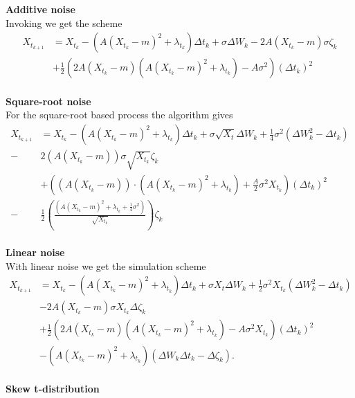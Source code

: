 \noindent \textbf{Additive noise}\\
Invoking \cite[algorithm 8.5]{Srkk2019} we get the scheme
\begin{align}
    X_{t_{k + 1}} &= X_{t_k} - \left(A(X_{t_k} - m)^2 + \lambda_{t_k}\right) \Delta t_k + \sigma \Delta W_{k} - 2 A \left(X_{t_k} - m\right)\sigma \zeta_{k} \nonumber \\
    & + \frac{1}{2}\left(2A\left(X_{t_k} - m\right)\left(A\left(X_{t_k} - m\right)^2 + \lambda_{t_k}\right) - A \sigma^2\right)\left(\Delta t_k\right)^2
\end{align}
\\
\textbf{Square-root noise}\\
For the square-root based process the algorithm gives 
\begin{align}
    X_{t_{k + 1}} &= X_{t_k} - \left(A(X_{t_k} - m)^2 + \lambda_{t_k}\right) \Delta t_k + \sigma \sqrt{X_t} \Delta W_{k} + \frac{1}{4}\sigma^2 \left(\Delta W_k^2 - \Delta t_k\right)\nonumber\\
    - & 2\left(A\left(X_{t_k} - m\right)\right)\sigma \sqrt{X_{t_k}} \zeta_k
    \nonumber\\ &+ \left(\left(A\left(X_{t_k} - m\right)\right)\cdot \left(A\left(X_{t_k} - m\right)^2 + \lambda_{t_k}\right) + \frac{A}{2}\sigma^2 X_{t_k}\right)(\Delta t_k)^2 \nonumber\\
    -&\frac{1}{2}\left(\frac{\left(A\left(X_{t_k} - m\right)^2 + \lambda_{t_k} + \frac{1}{4}\sigma^2\right)}{\sqrt{X_{t_k}}}\right) \zeta_k
\end{align}
\\
\textbf{Linear noise}\\
With linear noise we get the simulation scheme
\begin{align}
    X_{t_{k + 1}} &= X_{t_k} - \left(A(X_{t_k} - m)^2 + \lambda_{t_k}\right) \Delta t_k + \sigma X_t \Delta W_{k} + \frac{1}{2}\sigma^2 X_{t_k}\left(\Delta W_{k}^2 - \Delta t_k\right) \nonumber \\
    &-2A(X_{t_k} - m)\sigma X_{t_k} \Delta \zeta_k \nonumber\\
    & + \frac{1}{2}\left(2A\left(X_{t_k} - m\right)\left(A\left(X_{t_k} - m\right)^2 + \lambda_{t_k}\right) - A\sigma^2X_{t_k}\right)(\Delta t_k)^2 \nonumber \\
    &- \left(A\left(X_{t_k} - m\right)^2 + \lambda_{t_k}\right)\left(\Delta W_{k}\Delta t_k - \Delta \zeta_k\right).
\end{align}
\\
\textbf{Skew t-distribution}\\
